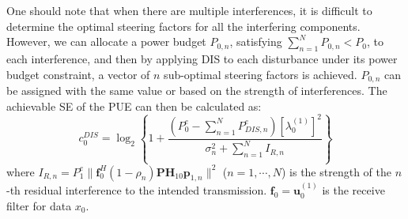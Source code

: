 \documentclass[10pt, conference, letterpaper]{IEEEtran}
\begin{document}
One should note that when there are multiple interferences, it is difficult to
determine the optimal steering factors for all the interfering components.
However, we can allocate a power budget $P_{0,n}$,
satisfying $\sum^{N}_{n=1}P_{0,n}<P_{0}$, to each interference, and
then by applying DIS to each disturbance under its power budget constraint,
a vector of $n$ sub-optimal steering factors is achieved.
$P_{0,n}$ can be assigned with the same value or based on the strength of interferences.
The achievable SE of the PUE can then be calculated as:
\begin{equation}
c^{DIS}_{0}=\log_{2}\left\{
1+\frac{\left(P^{e}_{0}-\sum^{N}_{n=1}P^{e}_{DIS,n}\right)[\lambda^{(1)}_{0}]^{2}}{\sigma^{2}_{n}
+\sum^{N}_{n=1}I_{R,n}} \right\}
\end{equation}
where $I_{R,n}=P^{e}_{1}\|\mathbf{f}^{H}_{0}(1-\rho_{n})\mathbf{P}\mathbf{H}_{10}
\mathbf{p}_{1,n}\|^{2}$ ($n=1,\cdots,N$)
is the strength of the $n$-th residual interference to the intended transmission.
$\mathbf{f}_{0}=\mathbf{u}^{(1)}_{0}$ is the receive filter for data $x_{0}$.
\end{document}
